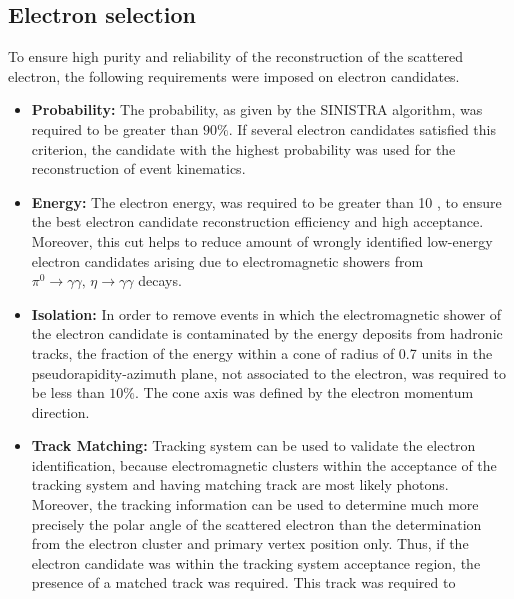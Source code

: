 \subsection{Electron selection}
\label{subsec:eleselect}

To ensure high purity and reliability of the reconstruction of the scattered electron, the following requirements were imposed on electron candidates.
\begin{itemize}
	\item \textbf{Probability:} The probability, as given by the SINISTRA algorithm, was required to be greater than $90\%$. If several electron candidates satisfied this criterion, the candidate with the highest probability was used for the reconstruction of event kinematics.
	\item \textbf{Energy:} The electron energy, \eefin was required to be greater than 10 \GeV, to ensure the best electron candidate reconstruction efficiency and high acceptance. Moreover, this cut helps to reduce amount of wrongly identified low-energy electron candidates arising due to electromagnetic showers from $\pi^0\rightarrow\gamma\gamma,\, \eta\rightarrow\gamma\gamma$ decays.
	\item \textbf{Isolation:} In order to remove events in which the electromagnetic shower of the electron candidate is contaminated by the energy deposits from hadronic tracks, the fraction of the energy within a cone of radius of 0.7 units in the pseudorapidity-azimuth plane, not associated to the electron, was required to be less than $10\%$. The cone axis was defined by the electron momentum direction.
	\item \textbf{Track Matching:} Tracking system can be used to validate the electron identification, because electromagnetic clusters within the acceptance of the tracking system and having matching track are most likely photons. Moreover, the tracking information can be used to determine much more precisely the polar angle of the scattered electron than the determination from the electron cluster and primary vertex position only. Thus, if the electron candidate was within the tracking system acceptance region, the presence of a matched track was required. This track was required to 

\end{itemize}
